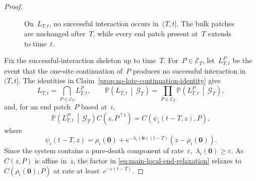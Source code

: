 \documentclass[EJP,preprint,NODS,nobera]{ejpecp}
\newcommand{\pP}{\mathbb{P}}
\newcommand{\CP}[2]{\pP\bb{#1\,\middle|\,#2}}
\newcommand{\bb}[1]{\left(#1\right)}
\newcommand{\mb}[1]{\mathbf{#1}}
\begin{document}
\begin{proof}
\begin{figure}[htbp]
\endgroup
\caption{On~$L_{T,t}$, no successful interaction occurs in~$(T,t]$. The bulk
patches are unchanged after~$T$, while every end patch present at~$T$ extends
to time~$t$.}
\label{fig:no-late-end-patches}
\end{figure}
\FloatBarrier

Fix the successful-interaction skeleton up to time~$T$. For~$P\in\mathcal E_T$, let~$L_{T,t}^P$ be the event that the one-site
continuation of~$P$ produces no successful interaction in~$(T,t]$. The
identities in Claim~\ref{prop:no-late-continuation-identity} give
\begin{equation*}
L_{T,t}
=
\bigcap_{P\in\mathcal E_T}L_{T,t}^P,
\qquad
\CP{L_{T,t}}{\mathcal G_T}
=
\prod_{P\in\mathcal E_T}
\CP{L_{T,t}^P}{\mathcal G_T},
\end{equation*}
and, for an end patch~$P$ based at~$i$,
\begin{equation}
\label{eq:main-local-end-relaxation}
\CP{L_{T,t}^P}{\mathcal G_T}
C\bb{z,P^{\uparrow t}}
=
C\bb{\psi_i(t-T,z),P},
\end{equation}
where
\begin{equation*}
\psi_i(t-T,z)
=
\rho_i(\mb 0)
+
e^{-\lambda_i(\mb 0)(t-T)}
\bb{z-\rho_i(\mb 0)}.
\end{equation*}
Since the system contains a pure-death component of rate~$\varepsilon$,~$\lambda_i(\mb 0)\geq\varepsilon$. As~$C(z,P)$ is affine in~$z$,
the factor in
\eqref{eq:main-local-end-relaxation} relaxes to~$C(\rho_i(\mb 0),P)$ at rate at least~$e^{-\varepsilon(t-T)}$.


\end{proof}
\end{document}
